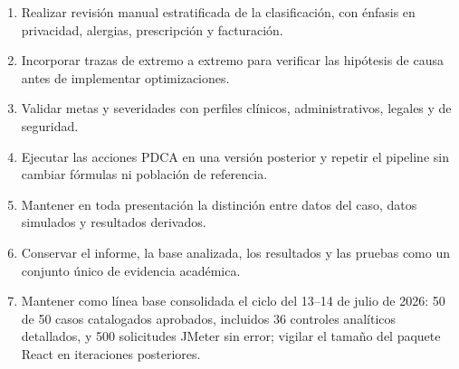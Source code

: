 \begin{enumerate}
  \item Realizar revisión manual estratificada de la clasificación, con énfasis en privacidad, alergias, prescripción y facturación.
  \item Incorporar trazas de extremo a extremo para verificar las hipótesis de causa antes de implementar optimizaciones.
  \item Validar metas y severidades con perfiles clínicos, administrativos, legales y de seguridad.
  \item Ejecutar las acciones PDCA en una versión posterior y repetir el pipeline sin cambiar fórmulas ni población de referencia.
  \item Mantener en toda presentación la distinción entre datos del caso, datos simulados y resultados derivados.
  \item Conservar el informe, la base analizada, los resultados y las pruebas como un conjunto único de evidencia académica.
  \item Mantener como línea base consolidada el ciclo del 13--14 de julio de 2026: 50 de 50 casos catalogados aprobados, incluidos 36 controles analíticos detallados, y 500 solicitudes JMeter sin error; vigilar el tamaño del paquete React en iteraciones posteriores.
\end{enumerate}
